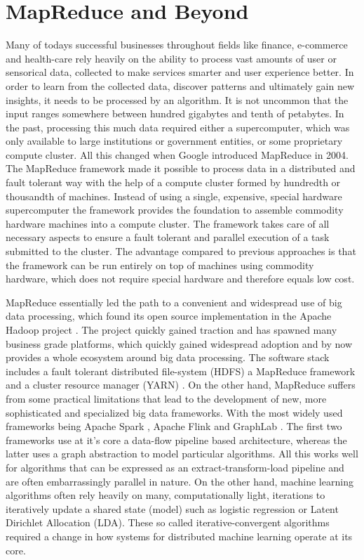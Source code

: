\section{MapReduce and Beyond}
Many of todays successful businesses throughout fields like finance, e-commerce and health-care rely heavily on the ability to process vast amounts of user or sensorical data, collected to make services smarter and user experience better.
In order to learn from the collected data, discover patterns and ultimately gain new insights, it needs to be processed by an algorithm.
It is not uncommon that the input ranges somewhere between hundred gigabytes and tenth of petabytes.
In the past, processing this much data required either a supercomputer, which was only available to large institutions or government entities, or some proprietary compute cluster.
All this changed when Google introduced MapReduce \cite{Dean2004} in 2004.
The MapReduce framework made it possible to process data in a distributed and fault tolerant way with the help of a compute cluster formed by hundredth or thousandth of machines.
Instead of using a single, expensive, special hardware supercomputer the framework provides the foundation to assemble commodity hardware machines into a compute cluster.
The framework takes care of all necessary aspects to ensure a fault tolerant and parallel execution of a task submitted to the cluster.
The advantage compared to previous approaches is that the framework can be run entirely on top of machines using commodity hardware, which does not require special hardware and therefore equals low cost.

MapReduce essentially led the path to a convenient and widespread use of big data processing, which found its open source implementation in the Apache Hadoop project \cite{hadoop2009hadoop}.
The project quickly gained traction and has spawned many business grade platforms, which quickly gained widespread adoption and by now provides a whole ecosystem around big data processing. The software stack includes a fault tolerant distributed file-system (HDFS) a MapReduce framework and a cluster resource manager (YARN) \cite{KumarVavilapalli2013}.
On the other hand, MapReduce suffers from some practical limitations that lead to the development of new, more sophisticated and specialized big data frameworks. With the most widely used frameworks being Apache Spark \cite{Zaharia2010}, Apache Flink \cite{Alexandrov2014} and GraphLab \cite{Low2012}.
The first two frameworks use at it's core a data-flow pipeline based architecture, whereas the latter uses a graph abstraction to model particular algorithms.
All this works well for algorithms that can be expressed as an extract-transform-load pipeline and are often embarrassingly parallel in nature.
On the other hand, machine learning algorithms often rely heavily on many, computationally light, iterations to iteratively update a shared state (model) such as logistic regression or Latent Dirichlet Allocation (LDA).
These so called iterative-convergent algorithms required a change in how systems for distributed machine learning operate at its core.


